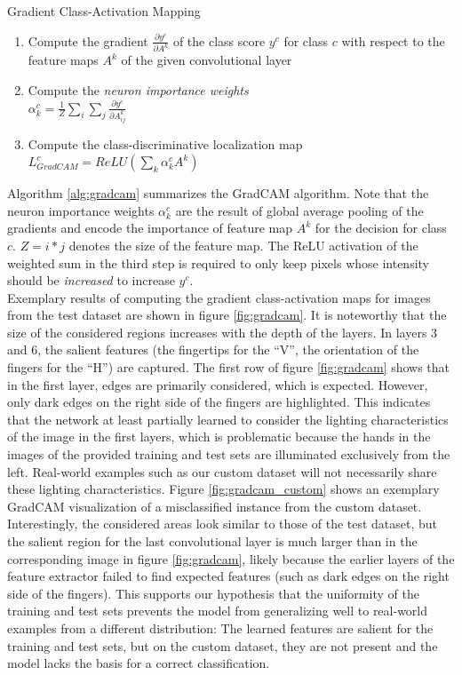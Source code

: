 \documentclass[a4paper]{article}
\begin{document}
\begin{algorithm}
     \caption{Gradient Class-Activation Mapping}
     \label{alg:gradcam}
     \begin{enumerate}
          \item Compute the gradient $\frac{\partial y^c}{\partial A^k}$ of the class score $y^c$ for class $c$ with respect to the feature maps $A^k$ of the given convolutional layer
          \item Compute the \textit{neuron importance weights}\\ $\alpha^c_k = \frac{1}{Z} \sum_i \sum_j \frac{\partial y^c}{\partial A^k_{ij}}$
          \item Compute the class-discriminative localization map\\
          $L^c_{GradCAM} = ReLU(\sum_k \alpha_k^c A^k)$
     \end{enumerate}
\end{algorithm}
Algorithm \ref{alg:gradcam} summarizes the GradCAM algorithm. Note that the neuron importance weights $\alpha_k^c$ are the result of global average pooling of the gradients and encode the importance of feature map $A^k$ for the decision for class $c$. $Z = i*j$ denotes the size of the feature map. The ReLU activation of the weighted sum in the third step is required to only keep pixels whose intensity should be \textit{increased} to increase $y^c$.\\
Exemplary results of computing the gradient class-activation maps for images from the test dataset are shown in figure \ref{fig:gradcam}. It is noteworthy that the size of the considered regions increases with the depth of the layers. In layers 3 and 6, the salient features (the fingertips for the \enquote{V}, the orientation of the fingers for the \enquote{H}) are captured. The first row of figure \ref{fig:gradcam} shows that in the first layer, edges are primarily considered, which is expected. However, only dark edges on the right side of the fingers are highlighted. This indicates that the network at least partially learned to consider the lighting characteristics of the image in the first layers, which is problematic because the hands in the images of the provided training and test sets are illuminated exclusively from the left. Real-world examples such as our custom dataset will not necessarily share these lighting characteristics. Figure \ref{fig:gradcam_custom} shows an exemplary GradCAM visualization of a misclassified instance from the custom dataset. Interestingly, the considered areas look similar to those of the test dataset, but the salient region for the last convolutional layer is much larger than in the corresponding image in figure \ref{fig:gradcam}, likely because the earlier layers of the feature extractor failed to find expected features (such as dark edges on the right side of the fingers). This supports our hypothesis that the uniformity of the training and test sets prevents the model from generalizing well to real-world examples from a different distribution: The learned features are salient for the training and test sets, but on the custom dataset, they are not present and the model lacks the basis for a correct classification.
\end{document}
